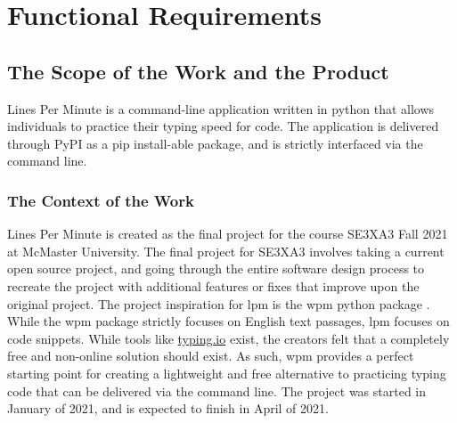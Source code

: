 \documentclass[12pt, titlepage]{article}
\begin{document}
\section{Functional Requirements}

\subsection{The Scope of the Work and the Product}
Lines Per Minute is a command-line application written in python that allows individuals to practice their typing speed for code. The application is delivered through PyPI as a pip install-able package, and is strictly interfaced via the command line.

\subsubsection{The Context of the Work}
Lines Per Minute is created as the final project for the course SE3XA3 Fall 2021 at McMaster University. The final project for SE3XA3 involves taking a current open source project, and going through the entire software design process to recreate the project with additional features or fixes that improve upon the original project. The project inspiration for lpm is the wpm python package \citep{wpm}. \\

While the wpm package strictly focuses on English text passages, lpm focuses on code snippets. While tools like \href{https://typing.io/}{typing.io} exist, the creators felt that a completely free and non-online solution should exist. As such, wpm provides a perfect starting point for creating a lightweight and free alternative to practicing typing code that can be delivered via the command line. The project was started in January of 2021, and is expected to finish in April of 2021.
\end{document}
